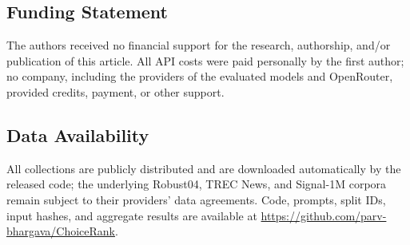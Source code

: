 \documentclass[12pt,a4paper]{article}
\begin{document}
\subsection*{Funding Statement}

The authors received no financial support for the research, authorship, and/or publication of this article. All API costs were paid personally by the first author; no company, including the providers of the evaluated models and OpenRouter, provided credits, payment, or other support.

\subsection*{Data Availability}

All collections are publicly distributed and are downloaded automatically by the released code; the underlying Robust04, TREC News, and Signal-1M corpora remain subject to their providers' data agreements. Code, prompts, split IDs, input hashes, and aggregate results are available at \url{https://github.com/parv-bhargava/ChoiceRank}.
\end{document}
